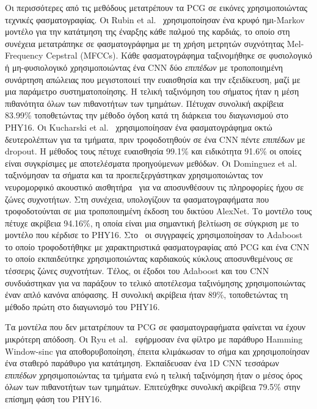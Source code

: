 Οι περισσότερες από τις μεθόδους μετατρέπουν τα PCG σε εικόνες χρησιμοποιώντας τεχνικές φασματογραφίας.
Οι Rubin et al.~\cite{rubin2017recognizing} χρησιμοποίησαν ένα κρυφό ημι-Markov μοντέλο για την κατάτμηση της έναρξης κάθε παλμού της καρδιάς, το οποίο στη συνέχεια μετατράπηκε σε φασματογράφημα με τη χρήση μετρητών συχνότητας Mel-Frequency Cepstral (MFCCs).
Κάθε φασματογράφημα ταξινομήθηκε σε φυσιολογικό ή μη-φυσιολογικό χρησιμοποιώντας ένα CNN δύο \textit{επιπέδων} με τροποποιημένη συνάρτηση απώλειας που μεγιστοποιεί την ευαισθησία και την εξειδίκευση, μαζί με μια παράμετρο συστηματοποίησης.
Η τελική ταξινόμηση του σήματος ήταν η μέση πιθανότητα όλων των πιθανοτήτων των τμημάτων.
Πέτυχαν συνολική ακρίβεια 83.99\% τοποθετώντας την μέθοδο όγδοη κατά τη διάρκεια του διαγωνισμού στο PHY16.
Οι Kucharski et al.~\cite{kucharski2017deep} χρησιμοποίησαν ένα φασματογράφημα οκτώ δευτερολέπτων για τα τμήματα, πριν τροφοδοτηθούν σε ένα CNN πέντε \textit{επιπέδων} με dropout.
Η μέθοδος τους πέτυχε ευαισθησία 99.1\% και ειδικότητα 91.6\% οι οποίες είναι συγκρίσιμες με αποτελέσματα προηγούμενων μεθόδων.
Οι Dominguez et al.~\cite{dominguez2018deep} ταξινόμησαν τα σήματα και τα προεπεξεργάστηκαν χρησιμοποιώντας τον νευρομορφικό ακουστικό αισθητήρα~\cite{jimenez2017binaural} για να αποσυνθέσουν τις πληροφορίες ήχου σε ζώνες συχνοτήτων.
Στη συνέχεια, υπολογίζουν τα φασματογραφήματα που τροφοδοτούνται σε μια τροποποιημένη έκδοση του δικτύου AlexNet.
Το μοντέλο τους πέτυχε ακρίβεια 94.16\%, η οποία είναι μια σημαντική βελτίωση σε σύγκριση με το μοντέλο που κέρδισε το PHY16.
Στο~\cite{potes2016ensemble} οι συγγραφείς χρησιμοποίησαν το Adaboost το οποίο τροφοδοτήθηκε με χαρακτηριστικά φασματογραφίας από PCG και ένα CNN το οποίο εκπαιδεύτηκε χρησιμοποιώντας καρδιακούς κύκλους αποσυνθεμένους σε τέσσερις ζώνες συχνοτήτων.
Τέλος, οι έξοδοι του Adaboost και του CNN συνδυάστηκαν για να παράξουν το τελικό αποτέλεσμα ταξινόμησης χρησιμοποιώντας έναν απλό κανόνα απόφασης.
Η συνολική ακρίβεια ήταν 89\%, τοποθετώντας τη μέθοδο πρώτη στο διαγωνισμό του PHY16.

Τα μοντέλα που δεν μετατρέπουν τα PCG σε φασματογραφήματα φαίνεται να έχουν μικρότερη απόδοση.
Οι Ryu et al.~\cite{ryu2016classification} εφήρμοσαν ένα φίλτρο με παράθυρο Hamming Window-sinc για αποθορυβοποίηση, έπειτα κλιμάκωσαν το σήμα και χρησιμοποίησαν ένα σταθερό παράθυρο για κατάτμηση.
Εκπαίδευσαν ένα 1D CNN τεσσάρων \textit{επιπέδων} χρησιμοποιώντας τα τμήματα ενώ η τελική ταξινόμηση ήταν ο μέσος όρος όλων των πιθανοτήτων των τμημάτων.
Επιτεύχθηκε συνολική ακρίβεια 79.5\% στην επίσημη φάση του PHY16.

